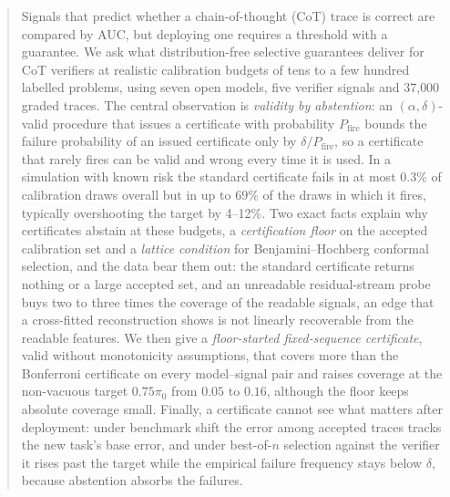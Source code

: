 \documentclass[twoside]{article}
\theoremstyle{remark}
\newcommand{\pizero}{\pi_0}
\newcommand{\pfire}{P_{\mathrm{fire}}}
\begin{document}

\begin{abstract}
Signals that predict whether a chain-of-thought (CoT) trace is correct are compared by AUC, but deploying one requires a threshold with a guarantee. We ask what distribution-free selective guarantees deliver for CoT verifiers at realistic calibration budgets of tens to a few hundred labelled problems, using seven open models, five verifier signals and 37{,}000 graded traces. The central observation is \emph{validity by abstention}: an $(\alpha,\delta)$-valid procedure that issues a certificate with probability $\pfire$ bounds the failure probability of an issued certificate only by $\delta/\pfire$, so a certificate that rarely fires can be valid and wrong every time it is used. In a simulation with known risk the standard certificate fails in at most $0.3\%$ of calibration draws overall but in up to $69\%$ of the draws in which it fires, typically overshooting the target by 4--12\%. Two exact facts explain why certificates abstain at these budgets, a \emph{certification floor} on the accepted calibration set and a \emph{lattice condition} for Benjamini--Hochberg conformal selection, and the data bear them out: the standard certificate returns nothing or a large accepted set, and an unreadable residual-stream probe buys two to three times the coverage of the readable signals, an edge that a cross-fitted reconstruction shows is not linearly recoverable from the readable features. We then give a \emph{floor-started fixed-sequence certificate}, valid without monotonicity assumptions, that covers more than the Bonferroni certificate on every model--signal pair and raises coverage at the non-vacuous target $0.75\pizero$ from $0.05$ to $0.16$, although the floor keeps absolute coverage small. Finally, a certificate cannot see what matters after deployment: under benchmark shift the error among accepted traces tracks the new task's base error, and under best-of-$n$ selection against the verifier it rises past the target while the empirical failure frequency stays below $\delta$, because abstention absorbs the failures.
\end{abstract}
\end{document}
